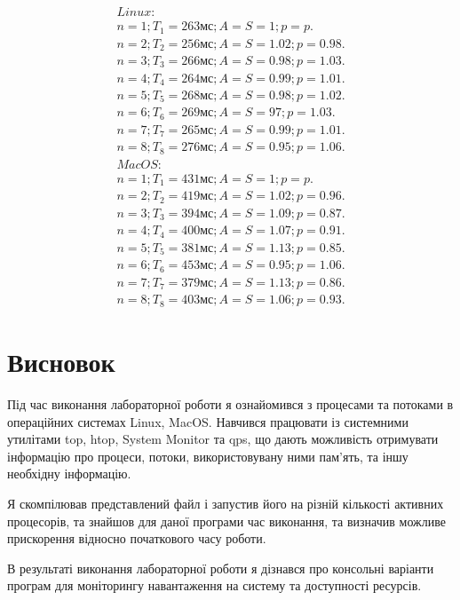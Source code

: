 \documentclass{article}
\begin{document}
\begin{normalsize}
	\begin{gather}
		Linux:\nonumber\\
		n=1; T_1=263\text{мс}; A=S=1; p=p.\nonumber\\
		n=2; T_2 =256\text{мс}; A=S=1.02; p=0.98.\nonumber\\
		n=3; T_3 =266\text{мс}; A=S=0.98; p=1.03.\nonumber\\
		n=4; T_4 =264\text{мс}; A=S=0.99; p=1.01.\nonumber\\
		n=5; T_5 =268\text{мс}; A=S=0.98; p=1.02.\nonumber\\
		n=6; T_6 =269\text{мс}; A=S=97; p=1.03.\nonumber\\
		n=7; T_7 =265\text{мс}; A=S=0.99; p=1.01.\nonumber\\
		n=8; T_8 =276\text{мс}; A=S=0.95; p=1.06.\nonumber\\
		MacOS:\nonumber\\
		n=1; T_1=431\text{мс}; A=S=1; p=p.\nonumber\\
		n=2; T_2 =419\text{мс}; A=S=1.02; p=0.96.\nonumber\\
		n=3; T_3 =394\text{мс}; A=S=1.09; p=0.87.\nonumber\\
		n=4; T_4 =400\text{мс}; A=S=1.07; p=0.91.\nonumber\\
		n=5; T_5 =381\text{мс}; A=S=1.13; p=0.85.\nonumber\\
		n=6; T_6 =453\text{мс}; A=S=0.95; p=1.06.\nonumber\\
		n=7; T_7 =379\text{мс}; A=S=1.13; p=0.86.\nonumber\\
		n=8; T_8 =403\text{мс}; A=S=1.06; p=0.93.\nonumber
	\end{gather}
	
	\section*{Висновок}
	Під час виконання лабораторної роботи я ознайомився з процесами та потоками в операційних системах  Linux, MacOS. Навчився працювати із системними утилітами top, htop, System Monitor та qps, що дають можливість отримувати інформацію про процеси, потоки, використовувану ними пам'ять, та іншу необхідну інформацію. 
	
	Я скомпілював представлений файл і запустив його на різній кількості активних процесорів, та знайшов для даної програми час виконання, та визначив можливе прискорення відносно початкового часу роботи.
	
	В результаті виконання лабораторної роботи я дізнався про консольні варіанти програм для моніторингу навантаження на систему та доступності ресурсів.    
\end{normalsize}
\end{document}
